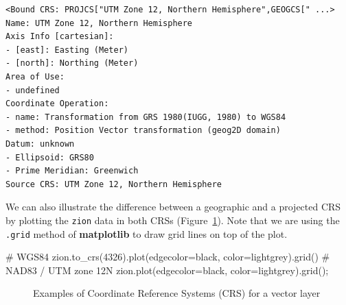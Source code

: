 \documentclass[
  letterpaper,
]{krantz}
\newenvironment{Shaded}{\begin{snugshade}}{\end{snugshade}}
\newcommand{\CommentTok}[1]{\textcolor[rgb]{0.37,0.37,0.37}{#1}}
\newcommand{\DecValTok}[1]{\textcolor[rgb]{0.68,0.00,0.00}{#1}}
\newcommand{\NormalTok}[1]{\textcolor[rgb]{0.00,0.23,0.31}{#1}}
\newcommand{\OperatorTok}[1]{\textcolor[rgb]{0.37,0.37,0.37}{#1}}
\newcommand{\StringTok}[1]{\textcolor[rgb]{0.13,0.47,0.30}{#1}}
\begin{document}
\begin{verbatim}
<Bound CRS: PROJCS["UTM Zone 12, Northern Hemisphere",GEOGCS[" ...>
Name: UTM Zone 12, Northern Hemisphere
Axis Info [cartesian]:
- [east]: Easting (Meter)
- [north]: Northing (Meter)
Area of Use:
- undefined
Coordinate Operation:
- name: Transformation from GRS 1980(IUGG, 1980) to WGS84
- method: Position Vector transformation (geog2D domain)
Datum: unknown
- Ellipsoid: GRS80
- Prime Meridian: Greenwich
Source CRS: UTM Zone 12, Northern Hemisphere
\end{verbatim}

We can also illustrate the difference between a geographic and a
projected CRS by plotting the \texttt{zion} data in both CRSs
(Figure~\ref{fig-zion-crs}). Note that we are using the \texttt{.grid}
method of \textbf{matplotlib} to draw grid lines on top of the plot.

\begin{Shaded}
\begin{Highlighting}[]
\CommentTok{\# WGS84}
\NormalTok{zion.to\_crs(}\DecValTok{4326}\NormalTok{).plot(edgecolor}\OperatorTok{=}\StringTok{\textquotesingle{}black\textquotesingle{}}\NormalTok{, color}\OperatorTok{=}\StringTok{\textquotesingle{}lightgrey\textquotesingle{}}\NormalTok{).grid()}
\CommentTok{\# NAD83 / UTM zone 12N}
\NormalTok{zion.plot(edgecolor}\OperatorTok{=}\StringTok{\textquotesingle{}black\textquotesingle{}}\NormalTok{, color}\OperatorTok{=}\StringTok{\textquotesingle{}lightgrey\textquotesingle{}}\NormalTok{).grid()}\OperatorTok{;}
\end{Highlighting}
\end{Shaded}

\begin{figure}

\begin{minipage}{0.50\linewidth}



\end{minipage}%
%
\begin{minipage}{0.50\linewidth}



\end{minipage}%

\caption{\label{fig-zion-crs}Examples of Coordinate Reference Systems
(CRS) for a vector layer}

\end{figure}%
\end{document}
